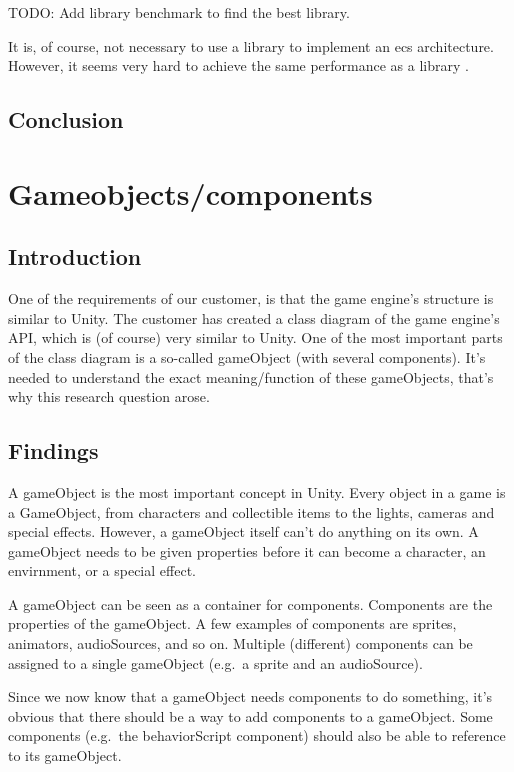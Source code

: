 \documentclass{projdoc}
\begin{document}
TODO: Add library benchmark to find the best library.

It is, of course, not necessary to use a library to implement an \gls{ecs}
architecture. However, it seems very hard to achieve the same performance as a
library \autocite{github:ecsfaq}.

\subsection{Conclusion}

\section{Gameobjects/components}
\label{sec:Gameobjects/components}

\subsection{Introduction}

One of the requirements of our customer, is that the game engine's structure is
similar to Unity. The customer has created a class diagram of the game engine's API,
which is (of course) very similar to Unity. One of the most important parts of the
class diagram is a so-called gameObject (with several components). It's needed to
understand the exact meaning/function of these gameObjects, that's why this research
question arose.

\subsection{Findings}

A gameObject is the most important concept in Unity. Every object in a game is a
GameObject, from characters and collectible items to the lights, cameras and special
effects. However, a gameObject itself can't do anything on its own. A gameObject
needs to be given properties before it can become a character, an envirnment, or a
special effect. \autocite{man:unityGameobjects}

A gameObject can be seen as a container for components. Components are the properties
of the gameObject. A few examples of components are sprites, animators, audioSources,
and so on. Multiple (different) components can be assigned to a single gameObject
(e.g.~a sprite and an audioSource).

Since we now know that a gameObject needs components to do something, it's obvious
that there should be a way to add components to a gameObject. Some components
(e.g.~the behaviorScript component) should also be able to reference to its
gameObject.
\end{document}
